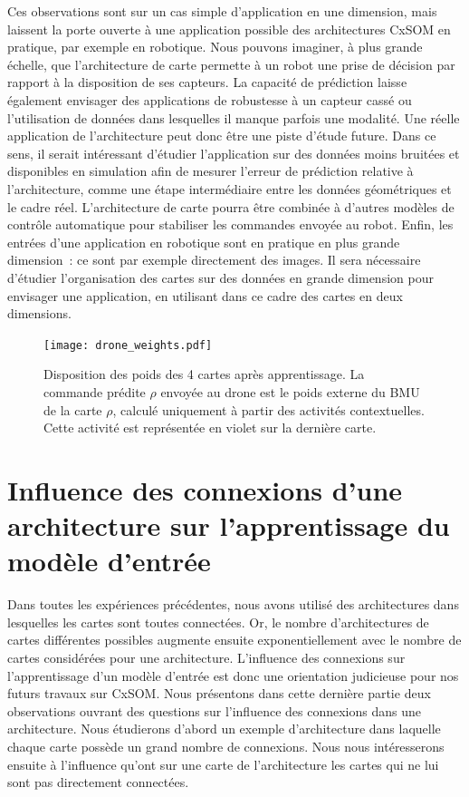\documentclass[../main]{subfiles}
\begin{document}
Ces observations sont sur un cas simple d'application en une dimension, mais laissent la porte ouverte à une application possible des architectures CxSOM en pratique, par exemple en robotique. 
Nous pouvons imaginer, à plus grande échelle, que l'architecture de carte permette à un robot une prise de décision par rapport à la disposition de ses capteurs. La capacité de prédiction laisse également envisager des applications de robustesse à un capteur cassé ou l'utilisation de données dans lesquelles il manque parfois une modalité.
Une réelle application de l'architecture peut donc être une piste d'étude future.
Dans ce sens, il serait intéressant d'étudier l'application sur des données moins bruitées et disponibles en simulation afin de mesurer l'erreur de prédiction relative à l'architecture, comme une étape intermédiaire entre les données géométriques et le cadre réel. 
L'architecture de carte pourra être combinée à d'autres modèles de contrôle automatique pour stabiliser les commandes envoyée au robot.
Enfin, les entrées d'une application en robotique sont en pratique en plus grande dimension~: ce sont par exemple directement des images. Il sera nécessaire d'étudier l'organisation des cartes sur des données en grande dimension pour envisager une application, en utilisant dans ce cadre des cartes en deux dimensions.

\begin{figure}
\texttt{[image: drone\_weights.pdf]}
\caption{Disposition des poids des 4 cartes après apprentissage. La commande prédite $\rho$ envoyée au drone est le poids externe du BMU de la carte $\rho$, calculé uniquement à partir des activités contextuelles. Cette activité est représentée en violet sur la dernière carte.}
\label{fig:drone_w}
\end{figure}

\section{Influence des connexions d'une architecture sur l'apprentissage du modèle d'entrée}

Dans toutes les expériences précédentes, nous avons utilisé des architectures dans lesquelles les cartes sont toutes connectées. Or, le nombre d'architectures de cartes différentes possibles augmente ensuite exponentiellement avec le nombre de cartes considérées pour une architecture.
L'influence des connexions sur l'apprentissage d'un modèle d'entrée est donc une orientation judicieuse pour nos futurs travaux sur CxSOM. 
Nous présentons dans cette dernière partie deux observations ouvrant des questions sur l'influence des connexions dans une architecture.
Nous étudierons d'abord un exemple d'architecture dans laquelle chaque carte possède un grand nombre de connexions.
Nous nous intéresserons ensuite à l'influence qu'ont sur une carte de l'architecture les cartes qui ne lui sont pas directement connectées.
\end{document}

